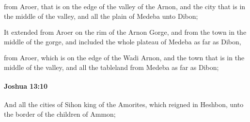 			\begin{versebox}
					\item[BHS] 
					\item[ASV] from Aroer, that is on the edge of the valley of the Arnon, and the city that is in the middle of the valley, and all the plain of Medeba unto Dibon;
					\item[NIV] It extended from Aroer on the rim of the Arnon Gorge, and from the town in the middle of the gorge, and included the whole plateau of Medeba as far as Dibon,
					\item[NRSV] from Aroer, which is on the edge of the Wadi Arnon, and the town that is in the middle of the valley, and all the tableland from Medeba as far as Dibon;
			\end{versebox}

		\paragraph{Joshua 13:10} %
			\label{JOSHUA-13-10}

			And all the cities of Sihon king of the Amorites, which reigned in Heshbon, unto the border of the children of Ammon;

